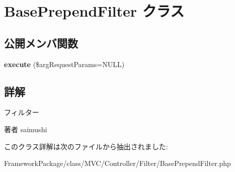 \hypertarget{class_base_prepend_filter}{}\section{Base\+Prepend\+Filter クラス}
\label{class_base_prepend_filter}
\subsection*{公開メンバ関数}
\begin{DoxyCompactItemize}
\item 
\hypertarget{class_base_prepend_filter_a8c915ee4ade472f815ef705305db3144}{}{\bfseries execute} (\$arg\+Request\+Params=N\+U\+L\+L)\label{class_base_prepend_filter_a8c915ee4ade472f815ef705305db3144}

\end{DoxyCompactItemize}


\subsection{詳解}
フィルター \begin{DoxyAuthor}{著者}
saimushi 
\end{DoxyAuthor}


このクラス詳解は次のファイルから抽出されました\+:\begin{DoxyCompactItemize}
\item 
Framework\+Package/class/\+M\+V\+C/\+Controller/\+Filter/Base\+Prepend\+Filter.\+php\end{DoxyCompactItemize}
